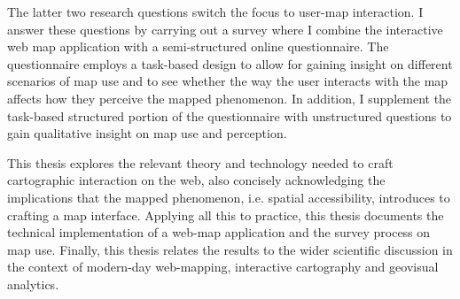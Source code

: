 The latter two research questions switch the focus to user-map interaction.
I answer these questions by carrying out a survey
where I combine the interactive web map application with
a semi-structured online questionnaire.
The questionnaire employs a task-based design
to allow for gaining insight on different scenarios of map use
and to see whether the way the user interacts with the map
affects how they perceive the mapped phenomenon.
In addition, I supplement the task-based structured portion of the questionnaire
with unstructured questions to gain qualitative insight on map use and perception.

This thesis explores the relevant theory and technology
needed to craft cartographic interaction on the web,
also concisely acknowledging the implications that the mapped phenomenon,
i.e. spatial accessibility, introduces to crafting a map interface.
Applying all this to practice, this thesis documents the technical implementation
of a web-map application and the survey process on map use.
Finally, this thesis relates the results to the wider scientific discussion
in the context of modern-day web-mapping, interactive cartography and geovisual analytics. 




